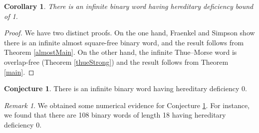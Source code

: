 \documentclass[12pt]{article}
\newcommand{\squarefree}{square-free}
\theoremstyle{plain}
\newtheorem{cor}[thm]{Corollary}
\theoremstyle{definition}
\newtheorem{con}[thm]{Conjecture}
\theoremstyle{remark}
\newtheorem{rem}[thm]{Remark}
\begin{document}
			\begin{cor}
				There is an infinite binary word having hereditary deficiency bound of 1.
			\end{cor}
			\begin{proof}
				We have two distinct proofs. On the one hand,
				Fraenkel and Simpson \cite{MR1309124} show there is an infinite almost {\squarefree} binary word,
				and the result follows from Theorem \ref{almostMain}.
				On the other hand, the infinite Thue--Morse word is overlap-free (Theorem \ref{thueStrong})
				and the result follows from Theorem \ref{main}.
			\end{proof}
			\begin{con}\label{evidence}
				There is an infinite binary word having hereditary deficiency 0.
			\end{con}
			\begin{rem}
				We obtained some numerical evidence for Conjecture \ref{evidence}.
				For instance, we found that there are 108 binary words of length 18 having hereditary deficiency 0.
			\end{rem}
\def\cprime{$'$}
\end{document}
